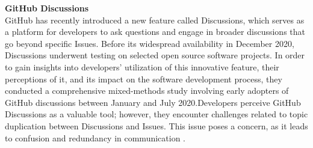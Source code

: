 \textbf{GitHub Discussions}\\
GitHub has recently introduced a new feature called Discussions, which serves as a platform for developers to ask questions and engage in broader discussions that go beyond specific Issues. Before its widespread availability in December 2020, Discussions underwent testing on selected open source software projects. In order to gain insights into developers' utilization of this innovative feature, their perceptions of it, and its impact on the software development process, they conducted a comprehensive mixed-methods study involving early adopters of GitHub discussions between January and July 2020.Developers perceive GitHub Discussions as a valuable tool; however, they encounter challenges related to topic duplication between Discussions and Issues. This issue poses a concern, as it leads to confusion and redundancy in communication \cite{hata2022github}.
